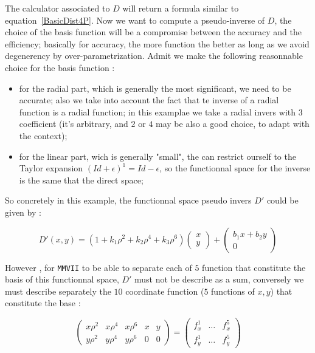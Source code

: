 The calculator associated to $D$ will return a formula similar to equation~\ref{BasicDist4P}.
Now we want to compute a pseudo-inverse of $D$, the choice of the basis function will be
a compromise between  the accuracy and the efficiency; basically for accuracy, the more
function the better as long as we avoid degenerency by over-parametrization.
Admit  we make the following reasonnable choice for the basis function  :

\begin{itemize}
    \item  for the radial part, which is generally the most significant,  we need to be accurate;
              also  we take into account the fact that te inverse of a radial function is a radial
              function; in this examplae we take  a radial invers with  $3$ coefficient
              (it's arbitrary, and $2$ or $4$ may be also a good choice, to adapt with the context);

    \item   for the linear part, wich is generally "small", the can restrict ourself to
	    the Taylor expansion $(Id+\epsilon)^1 = Id-\epsilon$, so the functionnal space
            for the inverse is the same that the direct space;
\end{itemize}

So concretely in this example, the functionnal space pseudo invers $D'$  could be given by  :

\begin{equation}
	D'(x,y) =  
	       (1 + k_1 \rho ^2  + k_2  \rho^4 + k_3 \rho^6)  \begin{pmatrix} x \\ y \end{pmatrix}
	      +   \begin{pmatrix} b_1 x + b_2 y  \\  0 \end{pmatrix}
	\label{BasicDistInv5P}
\end{equation}

However , for {\tt MMVII} to be able to separate each of $5$ function  that constitute the basis
of this functionnal space,   $D'$ must not be describe as a sum, conversely we must describe separately
the $10$ coordinate function ($5$ functions of $x,y$) that  constitute the base :

\begin{equation}
	\begin{pmatrix} x \rho ^2 & x \rho ^4  &  x \rho ^6   & x & y \\ 
		        y \rho ^2 & y \rho ^4  &  y \rho ^6   & 0 & 0
       \end{pmatrix}
       =
	\begin{pmatrix} f^1_x &  \dots  & f^5_x  \\
		        f^1_y &  \dots  & f^5_y
       \end{pmatrix}
\end{equation}

